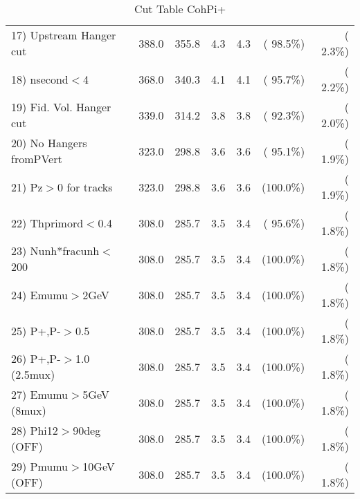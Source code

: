 \begin{table}[h!]
\begin{tabular}{||l||r|r|r|r|r|r||}
 17) Upstream Hanger cut  &        388.0 &        355.8 &          4.3 &          4.3 & ( 98.5\%) & (  2.3\%) \\
 18) nsecond$<$4          &        368.0 &        340.3 &          4.1 &          4.1 & ( 95.7\%) & (  2.2\%) \\
 19) Fid. Vol. Hanger cut &        339.0 &        314.2 &          3.8 &          3.8 & ( 92.3\%) & (  2.0\%) \\
 20) No Hangers fromPVert &        323.0 &        298.8 &          3.6 &          3.6 & ( 95.1\%) & (  1.9\%) \\
 21) Pz$>$0 for tracks    &        323.0 &        298.8 &          3.6 &          3.6 & (100.0\%) & (  1.9\%) \\
 22) Thprimord$<$0.4      &        308.0 &        285.7 &          3.5 &          3.4 & ( 95.6\%) & (  1.8\%) \\
 23) Nunh*fracunh$<$200   &        308.0 &        285.7 &          3.5 &          3.4 & (100.0\%) & (  1.8\%) \\
 24) Emumu$>$2GeV         &        308.0 &        285.7 &          3.5 &          3.4 & (100.0\%) & (  1.8\%) \\
 25) P+,P-$>$0.5          &        308.0 &        285.7 &          3.5 &          3.4 & (100.0\%) & (  1.8\%) \\
 26) P+,P-$>$1.0 (2.5mux) &        308.0 &        285.7 &          3.5 &          3.4 & (100.0\%) & (  1.8\%) \\
 27) Emumu$>$5GeV  (8mux) &        308.0 &        285.7 &          3.5 &          3.4 & (100.0\%) & (  1.8\%) \\
 28) Phi12$>$90deg  (OFF) &        308.0 &        285.7 &          3.5 &          3.4 & (100.0\%) & (  1.8\%) \\
 29) Pmumu$>$10GeV  (OFF) &        308.0 &        285.7 &          3.5 &          3.4 & (100.0\%) & (  1.8\%) \\
 \hline
 \hline
 \end{tabular}
 \caption{Cut Table  CohPi+   }
 \label{tab-cutcohjpsi-mumu_cohpip}
 \end{table}
